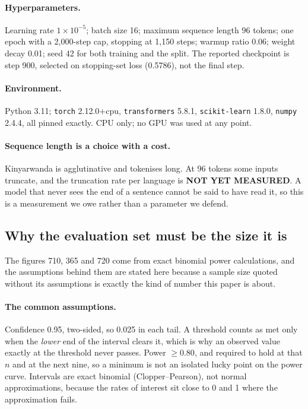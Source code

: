 \paragraph{Hyperparameters.} Learning rate $1\times10^{-5}$; batch size 16;
maximum sequence length 96 tokens; one epoch with a 2{,}000-step cap, stopping
at 1{,}150 steps; warmup ratio 0.06; weight decay 0.01; seed 42 for both
training and the split. The reported checkpoint is step 900, selected on
stopping-set loss (0.5786), not the final step.

\paragraph{Environment.} Python 3.11; \texttt{torch} 2.12.0+cpu,
\texttt{transformers} 5.8.1, \texttt{scikit-learn} 1.8.0, \texttt{numpy}
2.4.4, all pinned exactly. CPU only; no GPU was used at any point.

\paragraph{Sequence length is a choice with a cost.} Kinyarwanda is
agglutinative and tokenises long. At 96 tokens some inputs truncate, and the
truncation rate per language is \textbf{NOT YET MEASURED}. A model that never
sees the end of a sentence cannot be said to have read it, so this is a
measurement we owe rather than a parameter we defend.

\subsection{Why the evaluation set must be the size it is}
\label{sec:method:power}

The figures 710, 365 and 720 come from exact binomial power calculations, and
the assumptions behind them are stated here because a sample size quoted
without its assumptions is exactly the kind of number this paper is about.

\paragraph{The common assumptions.} Confidence 0.95, two-sided, so 0.025 in
each tail. A threshold counts as met only when the \emph{lower} end of the
interval clears it, which is why an observed value exactly at the threshold
never passes. Power $\geq 0.80$, and required to hold at that $n$ and at the
next nine, so a minimum is not an isolated lucky point on the power curve.
Intervals are exact binomial (Clopper--Pearson), not normal approximations,
because the rates of interest sit close to 0 and 1 where the approximation
fails.


